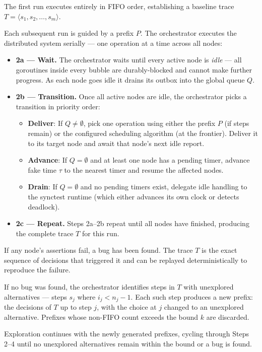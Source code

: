 \documentclass[11pt]{article}
\begin{document}
\begin{description}[leftmargin=0pt,labelindent=0pt]
\item[\textbf{Step 1 --- Baseline.}] The first run executes entirely in FIFO order, establishing a baseline trace $T = \langle s_1, s_2, \ldots, s_m \rangle$.

\item[\textbf{Step 2 --- Run.}] Each subsequent run is guided by a prefix $P$. The orchestrator executes the distributed system serially --- one operation at a time across all nodes:
\begin{itemize}[leftmargin=1.5em]
    \item \textbf{2a --- Wait.} The orchestrator waits until every active node is \emph{idle} --- all goroutines inside every bubble are durably-blocked and cannot make further progress. As each node goes idle it drains its outbox into the global queue $Q$.
    \item \textbf{2b --- Transition.} Once all active nodes are idle, the orchestrator picks a transition in priority order:
    \begin{itemize}[leftmargin=1.5em]
        \item \textbf{Deliver}: If $Q \neq \emptyset$, pick one operation using either the prefix $P$ (if steps remain) or the configured scheduling algorithm (at the frontier). Deliver it to its target node and await that node's next idle report.
        \item \textbf{Advance}: If $Q = \emptyset$ and at least one node has a pending timer, advance fake time $\tau$ to the nearest timer and resume the affected nodes.
        \item \textbf{Drain}: If $Q = \emptyset$ and no pending timers exist, delegate idle handling to the synctest runtime (which either advances its own clock or detects deadlock).
    \end{itemize}
    \item \textbf{2c --- Repeat.} Steps 2a--2b repeat until all nodes have finished, producing the complete trace $T$ for this run.
\end{itemize}

\item[\textbf{Step 3 --- Check.}] If any node's assertions fail, a bug has been found. The trace $T$ is the exact sequence of decisions that triggered it and can be replayed deterministically to reproduce the failure.

\item[\textbf{Step 4 --- Branch.}] If no bug was found, the orchestrator identifies steps in $T$ with unexplored alternatives --- steps $s_j$ where $i_j < n_j - 1$. Each such step produces a new prefix: the decisions of $T$ up to step $j$, with the choice at $j$ changed to an unexplored alternative. Prefixes whose non-FIFO count exceeds the bound $k$ are discarded.

\item[\textbf{Step 5 --- Repeat.}] Exploration continues with the newly generated prefixes, cycling through Steps 2--4 until no unexplored alternatives remain within the bound or a bug is found.
\end{description}
\end{document}
